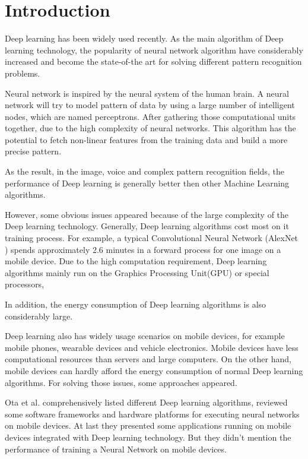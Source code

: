 \documentclass[article]{aaltoseries}
\begin{document}


\section{Introduction}


Deep learning has been widely used recently. As the main algorithm of Deep learning technology,
 the popularity of neural network algorithm 
 have considerably increased and become the state-of-the art for solving different pattern recognition
problems.

Neural network is inspired by the neural system of the human brain. A neural network will 
try to model pattern of data by using a large number of intelligent nodes, which are named perceptrons. 
After gathering those computational units together, due to the high complexity of neural networks. 
This algorithm has the potential to fetch non-linear features from the training data 
and build a more precise pattern.

As the result, in the image, voice and complex pattern recognition fields, the performance of Deep learning
is generally better then other Machine Learning algorithms.  

However, some obvious issues appeared because of the large complexity of the Deep learning technology. 
Generally, Deep learning algorithms cost most on it training process. 
For example, a typical Convolutional Neural Network (AlexNet \cite{NIPS2012_4824}) 
spends approximately 2.6 minutes in a forward process for one image on a mobile device\cite{lane2015early}.
Due to the high computation requirement, Deep learning algorithms mainly run on the Graphics Processing Unit(GPU) or special processors, 

In addition, the energy consumption of Deep learning algorithms is also considerably large. %

Deep learning also has widely usage scenarios on mobile devices, for example mobile phones, 
wearable devices and vehicle electronics. Mobile devices have less computational resources than 
servers and large computers. On the other hand, mobile devices can hardly afford the energy consumption
of normal Deep learning algorithms. For solving those issues, some approaches appeared.

Ota et al.\cite{Ota:2017} comprehensively listed different Deep learning algorithms,
reviewed some software frameworks and hardware platforms for executing neural networks on mobile devices.
At last they presented some applications running on mobile devices integrated with Deep learning technology. 
But they didn't mention the performance of training a Neural Network on mobile devices. 
\end{document}
